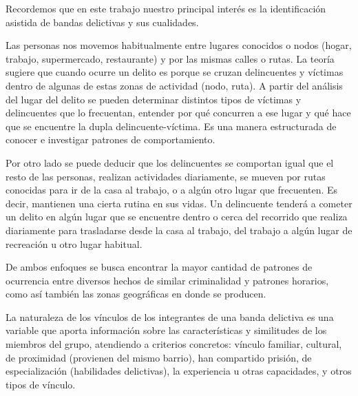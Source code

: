 Recordemos que en este trabajo nuestro principal interés es la identificación asistida de bandas delictivas y sus cualidades.  

Las personas nos movemos habitualmente entre lugares conocidos o nodos (hogar, trabajo, supermercado, restaurante) y por las mismas calles o rutas. La teoría sugiere que cuando ocurre un delito es porque se cruzan delincuentes y víctimas dentro de algunas de estas zonas de actividad (nodo, ruta). A partir del análisis del lugar del delito se pueden determinar distintos tipos de víctimas y delincuentes que lo frecuentan, entender por qué concurren a ese lugar y qué hace que se encuentre la dupla delincuente-víctima. Es una manera estructurada de conocer e investigar patrones de comportamiento.

Por otro lado se puede deducir que los delincuentes se comportan igual que el resto de las personas, realizan actividades diariamente, se mueven por rutas conocidas para ir de la casa al trabajo, o a algún otro lugar que frecuenten. Es decir, mantienen una cierta rutina en sus vidas. Un delincuente tenderá a cometer un delito en algún lugar que se encuentre dentro o cerca del recorrido que realiza diariamente para trasladarse desde la casa al trabajo, del trabajo a algún lugar de recreación u otro lugar habitual.

De ambos enfoques se busca encontrar la mayor cantidad de patrones de ocurrencia entre diversos hechos de similar criminalidad y patrones horarios, como así también las zonas geográficas en donde se producen.  

La naturaleza de los vínculos de los integrantes de una banda delictiva es una variable que aporta información sobre las características y similitudes de los miembros del grupo, atendiendo a criterios concretos: vínculo familiar, cultural, de proximidad (provienen del mismo barrio), han compartido prisión, de especialización (habilidades delictivas), la experiencia u otras capacidades, y otros tipos de vínculo.
